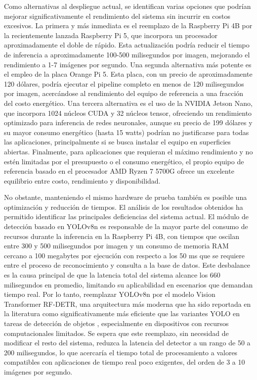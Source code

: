 Como alternativas al despliegue actual, se identifican varias opciones que podrían mejorar significativamente el rendimiento del sistema sin incurrir en costos excesivos. La primera y más inmediata es el reemplazo de la Raspberry Pi 4B por la recientemente lanzada Raspberry Pi 5, que incorpora un procesador aproximadamente el doble de rápido. Esta actualización podría reducir el tiempo de inferencia a aproximadamente 100-500 milisegundos por imagen, mejorando el rendimiento a 1-7 imágenes por segundo. Una segunda alternativa más potente es el empleo de la placa Orange Pi 5. Esta placa, con un precio de aproximadamente 120 dólares, podría ejecutar el pipeline completo en menos de 120 milisegundos por imagen, acercándose al rendimiento del equipo de referencia a una fracción del costo energético. Una tercera alternativa es el uso de la NVIDIA Jetson Nano, que incorpora 1024 núcleos CUDA y 32 núcleos tensor, ofreciendo un rendimiento optimizado para inferencia de redes neuronales, aunque su precio de 199 dólares y su mayor consumo energético (hasta 15 watts) podrían no justificarse para todas las aplicaciones, principalmente si se busca instalar el equipo en superficies abiertas. Finalmente, para aplicaciones que requieran el máximo rendimiento y no estén limitadas por el presupuesto o el consumo energético, el propio equipo de referencia basado en el procesador AMD Ryzen 7 5700G ofrece un excelente equilibrio entre costo, rendimiento y disponibilidad.

No obstante, manteniendo el mismo hardware de prueba también es posible una optimización y reducción de tiempos. El análisis de los resultados obtenidos ha permitido identificar las principales deficiencias del sistema actual. El módulo de detección basado en YOLOv8n es responsable de la mayor parte del consumo de recursos durante la inferencia en la Raspberry Pi 4B, con tiempos que oscilan entre 300 y 500 milisegundos por imagen y un consumo de memoria RAM cercano a 100 megabytes por ejecución con respecto a los 50 ms que se requiere entre el proceso de reconocimiento y consulta a la base de datos. Este desbalance es la causa principal de que la latencia total del sistema alcance los 660 milisegundos en promedio, limitando su aplicabilidad en escenarios que demandan tiempo real. Por lo tanto, reemplazar YOLOv8n por el modelo Vision Transformer RF-DETR, una arquitectura más moderna que ha sido reportada en la literatura como significativamente más eficiente que las variantes YOLO en tareas de detección de objetos \cite{wang-ke2021}, especialmente en dispositivos con recursos computacionales limitados. Se espera que este reemplazo, sin necesidad de modificar el resto del sistema, reduzca la latencia del detector a un rango de 50 a 200 milisegundos, lo que acercaría el tiempo total de procesamiento a valores compatibles con aplicaciones de tiempo real poco exigentes, del orden de 3 a 10 imágenes por segundo.

